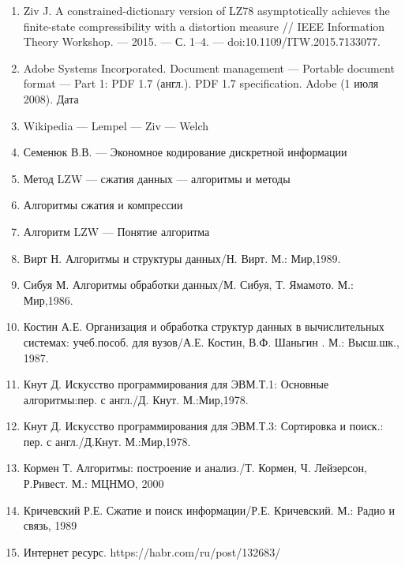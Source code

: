 \documentclass[a4paper]{article}
\begin{document}
\begin{enumerate}
\item Ziv J. A constrained-dictionary version of LZ78 asymptotically achieves the finite-state compressibility with a distortion measure // IEEE Information Theory Workshop. — 2015. — С. 1–4. — doi:10.1109/ITW.2015.7133077.
\item Adobe Systems Incorporated. Document management — Portable document format — Part 1: PDF 1.7 (англ.). PDF 1.7 specification. Adobe (1 июля 2008). Дата
\item Wikipedia — Lempel — Ziv — Welch
\item Семенюк В.В. — Экономное кодирование дискретной информации
\item Метод LZW — сжатия данных — алгоритмы и методы
\item Алгоритмы сжатия и компрессии
\item Алгоритм LZW — Понятие алгоритма
\item Вирт Н. Алгоритмы и структуры данных/Н. Вирт. М.: Мир,1989.
\item Сибуя М. Алгоритмы обработки данных/М. Сибуя, Т. Ямамото. М.: Мир,1986.
\item Костин А.Е. Организация и обработка структур данных в вычислительных системах: учеб.пособ. для вузов/А.Е. Костин, В.Ф. Шаньгин . М.: Высш.шк., 1987.
\item Кнут Д. Искусство программирования для ЭВМ.Т.1: Основные алгоритмы:пер. с англ./Д. Кнут. М.:Мир,1978.
\item Кнут Д. Искусство программирования для ЭВМ.Т.3: Сортировка и поиск.: пер. с англ./Д.Кнут. М.:Мир,1978.
\item Кормен Т. Алгоритмы: построение и анализ./Т. Кормен, Ч. Лейзерсон, Р.Ривест. М.: МЦНМО, 2000
\item Кричевский Р.Е. Сжатие и поиск информации/Р.Е. Кричевский. М.: Радио и связь, 1989
\item Интернет ресурс. https://habr.com/ru/post/132683/
\end{enumerate}
\end{document}
